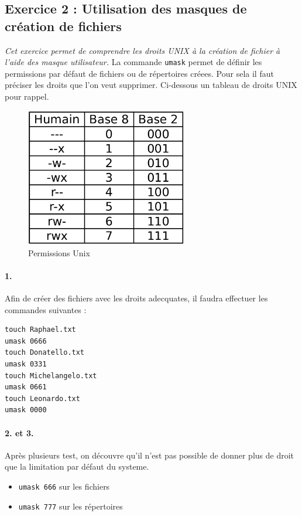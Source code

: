 \subsection{Exercice 2 : Utilisation des masques de création de fichiers}
\textit{Cet exercice permet de comprendre les droits UNIX à la création de fichier à l'aide des masque utilisateur.}
La commande \texttt{umask} permet de définir les permissions par défaut de fichiers ou de répertoires  créees. Pour sela il faut préciser les droits que l'on veut supprimer.
Ci-dessous un tableau de droits UNIX pour rappel.

\begin{figure}[H]
\centering
\includegraphics[width=200pt]{./shell/Pictures/permissions}
\caption{Permissions Unix}
\label{Permissions Unix}
\end{figure}

\paragraph{1.}
Afin de créer des fichiers avec les droits adecquates, il faudra effectuer les commandes suivantes :
\begin{verbatim}
touch Raphael.txt
umask 0666
touch Donatello.txt
umask 0331
touch Michelangelo.txt
umask 0661
touch Leonardo.txt
umask 0000
\end{verbatim}

\paragraph{2. et 3.}
Après plusieurs test, on découvre qu'il n'est pas possible de donner plus de droit que la limitation par défaut du systeme.
\begin{itemize}
\item \texttt{umask 666} sur les fichiers
\item \texttt{umask 777} sur les répertoires
\end{itemize}

